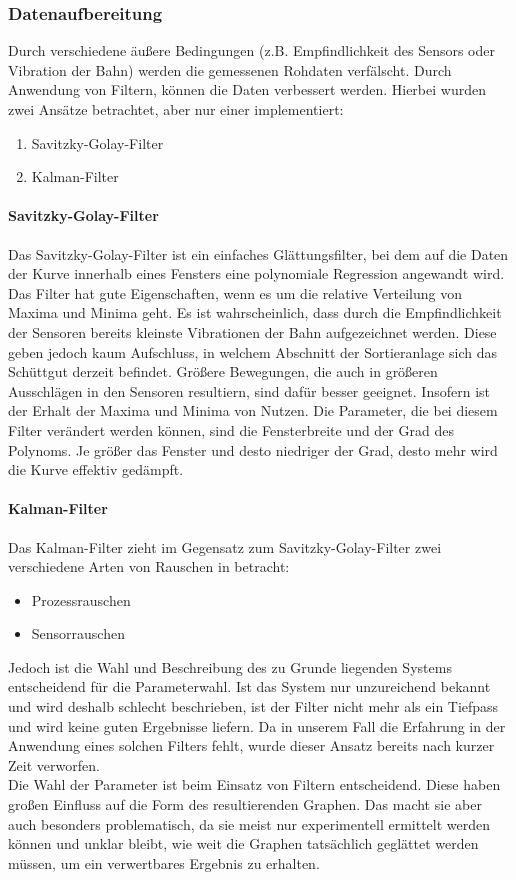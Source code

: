 \subsubsection{Datenaufbereitung}
Durch verschiedene äußere Bedingungen (z.B. Empfindlichkeit des Sensors oder Vibration der Bahn) werden die gemessenen Rohdaten verfälscht. Durch Anwendung von Filtern, können die Daten verbessert werden.
Hierbei wurden zwei Ansätze betrachtet, aber nur einer implementiert:
\begin{enumerate}
\item Savitzky-Golay-Filter
\item Kalman-Filter
\end{enumerate}
\paragraph{Savitzky-Golay-Filter}
Das Savitzky-Golay-Filter ist ein einfaches Glättungsfilter, bei dem auf die Daten der Kurve innerhalb eines Fensters eine polynomiale Regression angewandt wird. Das Filter hat gute Eigenschaften, wenn es um die relative Verteilung von Maxima und Minima geht. Es ist wahrscheinlich, dass durch die Empfindlichkeit der Sensoren bereits kleinste Vibrationen der Bahn aufgezeichnet werden. Diese geben jedoch kaum Aufschluss, in welchem Abschnitt der Sortieranlage sich das Schüttgut derzeit befindet. Größere Bewegungen, die auch in größeren Ausschlägen in den Sensoren resultiern, sind dafür besser geeignet. Insofern ist der Erhalt der Maxima und Minima von Nutzen.
Die Parameter, die bei diesem Filter verändert werden können, sind die Fensterbreite und der Grad des Polynoms. Je größer das Fenster und desto niedriger der Grad, desto mehr wird die Kurve effektiv gedämpft.
\paragraph{Kalman-Filter}
Das Kalman-Filter zieht im Gegensatz zum Savitzky-Golay-Filter zwei verschiedene Arten von Rauschen in betracht:
\begin{itemize}
\item Prozessrauschen 
\item Sensorrauschen
\end{itemize}
Jedoch ist die Wahl und Beschreibung des zu Grunde liegenden Systems entscheidend für die Parameterwahl. Ist das System nur unzureichend bekannt und wird deshalb schlecht beschrieben, ist der Filter nicht mehr als ein Tiefpass und wird keine guten Ergebnisse liefern. Da in unserem Fall die Erfahrung in der Anwendung eines solchen Filters fehlt, wurde dieser Ansatz bereits nach kurzer Zeit verworfen.\\
Die Wahl der Parameter ist beim Einsatz von Filtern entscheidend. Diese haben großen Einfluss auf die Form des resultierenden Graphen. Das macht sie aber auch besonders problematisch, da sie meist nur experimentell ermittelt werden können und unklar bleibt, wie weit die Graphen tatsächlich geglättet werden müssen, um ein verwertbares Ergebnis zu erhalten. 